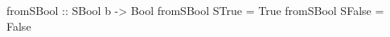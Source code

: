\begin{code}
fromSBool :: SBool b -> Bool
fromSBool STrue  = True
fromSBool SFalse = False
\end{code}
